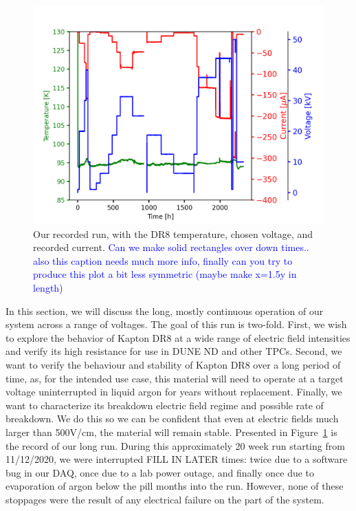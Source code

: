 \documentclass[a4paper,12pt]{article}
\newcommand{\RI}[1]{\textcolor{blue}{#1}}
\begin{document}
\begin{figure}[htb]
	\centerline{\includegraphics[width=\linewidth]{longrun.png}}
	
	\caption{Our recorded run, with the DR8 temperature, chosen voltage, and recorded current. \RI{Can we make solid rectangles over down times.. also this caption needs much more info, finally can you try to produce this plot a bit less symmetric (maybe make x=1.5y in length)} }
	\label{fig:stab}
\end{figure}
In this section, we will discuss the long, mostly continuous operation of our system across a range of voltages. The goal of this run is two-fold. First, we wish to explore the behavior of Kapton DR8 at a wide range of electric field intensities and verify its high resistance for use in DUNE ND and other TPCs. Second, we want to verify the behaviour and stability of Kapton DR8 over a long period of time, as, for the intended use case, this material will need to operate at a target voltage uninterrupted in liquid argon for years without replacement. Finally, we want to characterize its breakdown electric field regime and possible rate of breakdown. We do this so we can be confident that even at electric fields much larger than 500V/cm, the material will remain stable. Presented in Figure~\ref{fig:stab} is the record of our long run. During this approximately 20 week run starting from 11/12/2020, we were interrupted FILL IN LATER times: twice due to a software bug in our DAQ, once due to a lab power outage, and finally once due to evaporation of argon below the pill months into the run. However, none of these stoppages were the result of any electrical failure on the part of the system.
\end{document}
